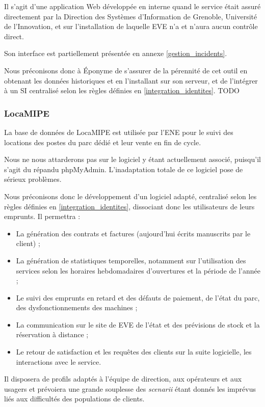 Il s'agit d'une application Web développée en interne quand le service était
assuré directement par la Direction des Systèmes d'Information de Grenoble,
Université de l'Innovation, et sur l'installation de laquelle EVE n'a et
n'aura aucun contrôle direct.

Son interface est partiellement présentée en annexe \ref{gestion_incidents}.

Nous préconisons donc à Éponyme de s'assurer de la pérennité de cet outil
en obtenant les données historiques et en l'installant sur son serveur,
et de l'intégrer à un SI centralisé selon les règles définies en
\ref{integration_identites}.
TODO \label{integration_identites}

\subsubsection{LocaMIPE}

La base de données de LocaMIPE est utilisée par l'ENE pour le suivi des
locations des postes du parc dédié et leur vente en fin de cycle.

Nous ne nous attarderons pas sur le logiciel y étant actuellement associé,
puisqu'il s'agit du répandu phpMyAdmin. L'inadaptation totale de ce logiciel
pose de sérieux problèmes.

Nous préconisons donc le développement d'un logiciel adapté, centralisé selon
les règles définies en \ref{integration_identites}, dissociant donc les
utilisateurs de leurs emprunts. Il permettra :
\begin{itemize}
\item La génération des contrats et factures (aujourd'hui écrits manuscrits
      par le client) ;
\item La génération de statistiques temporelles, notamment sur l'utilisation
      des services selon les horaires hebdomadaires d'ouvertures et
      la période de l'année ;
\item Le suivi des emprunts en retard et des défauts de paiement, de l'état
      du parc, des dysfonctionnements des machines ;
\item La communication sur le site de EVE de l'état et des prévisions de
      stock et la réservation à distance ;
\item Le retour de satisfaction et les requêtes des clients sur la suite
      logicielle, les interactions avec le service.
\end{itemize}

Il disposera de profils adaptés à l'équipe de direction, aux opérateurs et
aux usagers et prévoiera une grande souplesse des \textit{scenarii} étant
donnés les imprévus liés aux difficultés des populations de clients.

